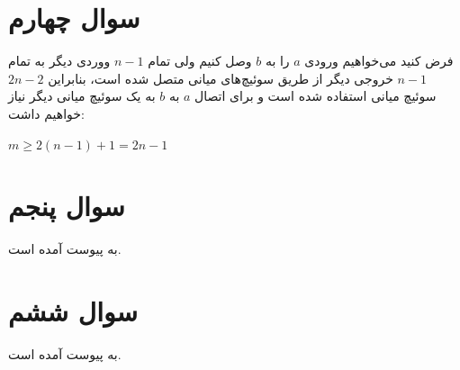 \documentclass[paper=a4, fontsize=11pt]{article}
\numberwithin{equation}{section} %
\numberwithin{figure}{section} %
\numberwithin{table}{section} %
\begin{document}
\section{سوال چهارم}
فرض کنید می‌خواهیم ورودی $a$ را به $b$
وصل کنیم ولی تمام $n-1$ ووردی دیگر
به تمام $n-1$ خروجی دیگر از طریق سوئیچ‌های میانی متصل شده است،
بنابراین $2n-2$ سوئیچ میانی استفاده شده است و
برای اتصال $a$ به $b$ به یک سوئیچ میانی دیگر نیاز خواهیم داشت:

$m \ge 2(n - 1) + 1 = 2n - 1$

\section{سوال پنجم}
\par
به پیوست آمده است.

\section{سوال ششم}
\par
به پیوست آمده است.
\end{document}
